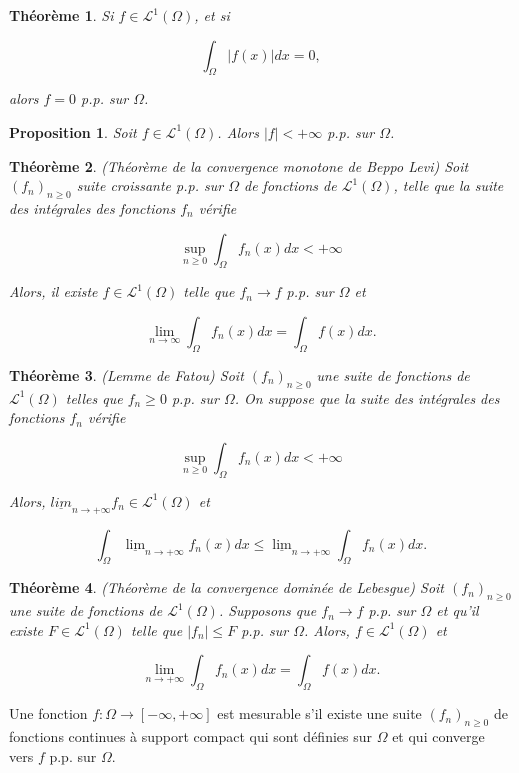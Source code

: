 \documentclass[10pt,a4paper,oneside]{article}
\newtheorem{theoreme}{Théorème}
\newtheorem{proposition}{Proposition}
\newenvironment{definition}[1][Definition]{\begin{trivlist}
\item[\hskip \labelsep {\bfseries #1}]}{\end{trivlist}}
\begin{document}
\begin{theoreme}
Si $f \in \mathcal{L}^1(\Omega)$, et si

\[ \int_\Omega |f(x)| dx = 0, \]

alors $f = 0$ p.p. sur $\Omega$.
\end{theoreme}

\begin{proposition}
Soit $f \in \mathcal{L}^1(\Omega)$. Alors $|f| < +\infty$ p.p. sur $\Omega$.
\end{proposition}

\begin{theoreme}
(Théorème de la convergence monotone de Beppo Levi)
Soit $(f_n)_{n \geq 0}$ suite croissante p.p. sur $\Omega$ de fonctions de $\mathcal{L}^1(\Omega)$, telle que la suite des intégrales des fonctions $f_n$ vérifie

\[ \sup_{n \geq 0} \int_\Omega f_n(x) dx < +\infty \]

Alors, il existe $f \in \mathcal{L}^1(\Omega)$ telle que $f_n \to f$ p.p. sur $\Omega$ et

\[ \lim_{n \to \infty} \int_\Omega f_n(x) dx = \int_\Omega f(x) dx. \]
\end{theoreme}

\begin{theoreme}
(Lemme de Fatou)
Soit $(f_n)_{n \geq 0}$ une suite de fonctions de $\mathcal{L}^1(\Omega)$ telles que $f_n \geq 0$ p.p. sur $\Omega$. On suppose que la suite des intégrales des fonctions $f_n$ vérifie

\[ \sup_{n \geq 0} \int_\Omega f_n(x) dx < +\infty \]

Alors, $\underline{lim}_{n \to +\infty} f_n \in \mathcal{L}^1(\Omega)$ et

\[ \int_\Omega \underline{\lim}_{n \to +\infty} f_n(x) dx \leq \underline{\lim}_{n \to +\infty} \int_\Omega f_n(x) dx. \]
\end{theoreme}

\begin{theoreme}
(Théorème de la convergence dominée de Lebesgue)
Soit $(f_n)_{n \geq 0}$ une suite de fonctions de $\mathcal{L}^1(\Omega)$. Supposons que $f_n \to f$ p.p. sur $\Omega$ et qu'il existe $F \in \mathcal{L}^1(\Omega)$ telle que $|f_n| \leq F$ p.p. sur $\Omega$. Alors, $f \in \mathcal{L}^1(\Omega)$ et

\[ \lim_{n \to +\infty} \int_\Omega f_n(x) dx = \int_\Omega f(x) dx. \]
\end{theoreme}

\begin{definition}
Une fonction $f : \Omega \to [-\infty,+\infty]$ est mesurable s'il existe une suite $(f_n)_{n \geq 0}$ de fonctions continues à support compact qui sont définies sur $\Omega$ et qui converge vers $f$ p.p. sur $\Omega$.
\end{definition}
\end{document}
